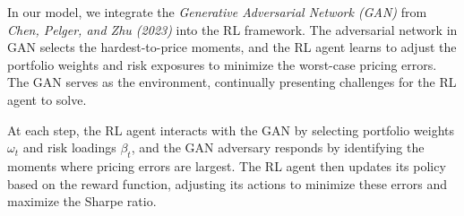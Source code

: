 In our model, we integrate the \textit{Generative Adversarial Network (GAN)} from \textit{Chen, Pelger, and Zhu (2023)} into the RL framework. The adversarial network in GAN selects the hardest-to-price moments, and the RL agent learns to adjust the portfolio weights and risk exposures to minimize the worst-case pricing errors. The GAN serves as the environment, continually presenting challenges for the RL agent to solve.

At each step, the RL agent interacts with the GAN by selecting portfolio weights $\omega_t$ and risk loadings $\beta_t$, and the GAN adversary responds by identifying the moments where pricing errors are largest. The RL agent then updates its policy based on the reward function, adjusting its actions to minimize these errors and maximize the Sharpe ratio.
